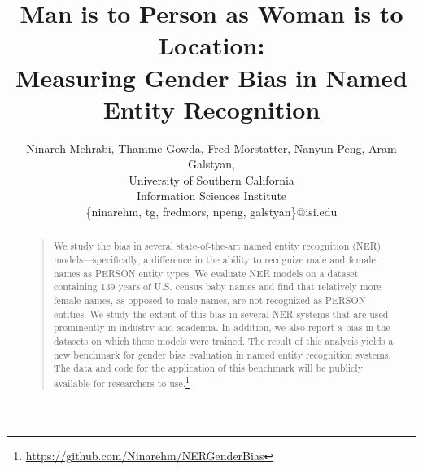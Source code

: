 \documentclass[letterpaper]{article}
\begin{document}
%
\title{Man is to Person as Woman is to Location: \\Measuring Gender Bias in Named Entity Recognition}%
\author{Ninareh Mehrabi, Thamme Gowda, Fred Morstatter, Nanyun Peng, Aram Galstyan, \\
 University of Southern California\\
        Information Sciences Institute\\
        \{ninarehm, tg, fredmors, npeng, galstyan\}@isi.edu}
\maketitle
\begin{abstract}
\begin{quote}

We study the bias in several state-of-the-art named entity recognition (NER) models---specifically, a  difference in the ability to recognize male and female names as PERSON entity types.
We evaluate NER models on a dataset containing  139 years of U.S. census baby names and find that relatively more female names, as opposed to male names, are not recognized as PERSON entities. We study the extent of this bias in several NER systems that are used prominently in industry and academia. In addition, we also report a bias in the datasets on which these models were trained. 
The result of this analysis yields a new benchmark for gender bias evaluation in named entity recognition systems.
The data and code for the application of this benchmark will be publicly available for researchers to use.\footnote{\label{projecturl}\url{https://github.com/Ninarehm/NERGenderBias}}

\end{quote}
\end{abstract}
 








\end{document}
